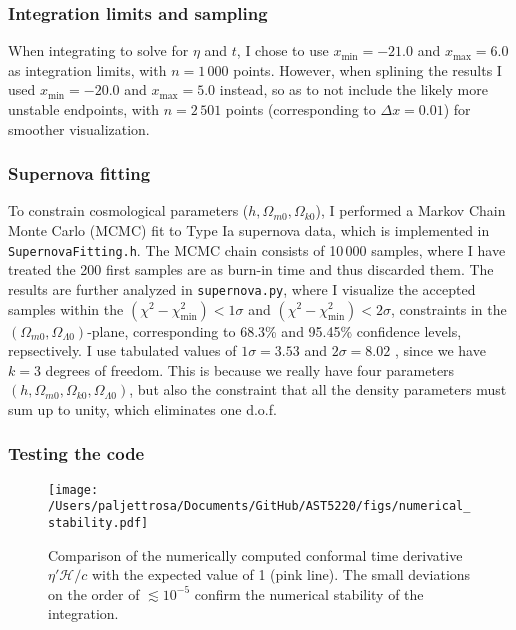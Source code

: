 \documentclass{aa}
\numberwithin{equation}{section}
\numberwithin{table}{section}
\numberwithin{figure}{section}
\begin{document}
\subsubsection{Integration limits and sampling}
When integrating to solve for $\eta$ and $t$, I chose to use $x_\text{min}=-21.0$ and $x_\text{max}=6.0$ as integration limits, with $n=1\,000$ points. However, when splining the results I used $x_\text{min}=-20.0$ and $x_\text{max}=5.0$ instead, so as to not include the likely more unstable endpoints, with $n=2\,501$ points (corresponding to $\Delta x = 0.01$) for smoother visualization.


\subsubsection{Supernova fitting}
To constrain cosmological parameters ($h, \Omega_{m0}, \Omega_{k0}$), I performed a Markov Chain Monte Carlo (MCMC) fit to Type Ia supernova data, which is implemented in \verb|SupernovaFitting.h|. The MCMC chain consists of 10$\,$000 samples, where I have treated the 200 first samples are as burn-in time and thus discarded them. The results are further analyzed in \verb|supernova.py|, where I visualize the accepted samples within the $(\chi^2-\chi^2_\text{min})<1\sigma$ and $(\chi^2-\chi^2_\text{min})<2\sigma$, constraints in the $(\Omega_{m0},\Omega_{\Lambda0})$-plane, corresponding to 68.3\% and 95.45\% confidence levels, repsectively. I use tabulated values of $1\sigma=3.53$ and $2\sigma=8.02$ \citep[see][]{Chi2}, since we have $k=3$ degrees of freedom. This is because we really have four parameters $(h, \Omega_{m0}, \Omega_{k0}, \Omega_{\Lambda0})$, but also the constraint that all the density parameters must sum up to unity, which eliminates one d.o.f. 

\subsubsection{Testing the code}\label{subsubsec: I methods testing}
\begin{figure}
    \centering
    \texttt{[image: /Users/paljettrosa/Documents/GitHub/AST5220/figs/numerical\_stability.pdf]}
    \caption{Comparison of the numerically computed conformal time derivative  $\eta'\mathcal{H}/c$ with the expected value of 1 (pink line). The small deviations on the order of $\lesssim 10^{-5}$ confirm the numerical stability of the integration.}\label{fig:numerical stability}
\end{figure}
\end{document}
